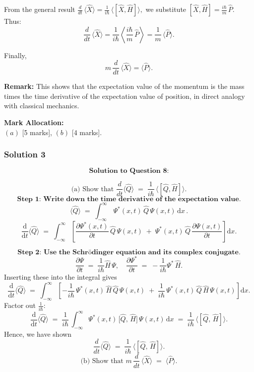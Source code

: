 \documentclass{article}
\begin{document}
From the general result
\(\displaystyle \frac{d}{dt}\,\langle \hat{X} \rangle 
= \frac{1}{i\hbar}\,\bigl\langle [\hat{X}, \hat{H}] \bigr\rangle,\)
we substitute \([\hat{X}, \hat{H}] = \frac{i\hbar}{m}\,\hat{P}\). Thus:
\[
\frac{d}{dt}\,\langle \hat{X} \rangle 
= \frac{1}{i\hbar} \left\langle \frac{i\hbar}{m}\,\hat{P} \right\rangle 
= \frac{1}{m}\,\langle \hat{P} \rangle.
\]

Finally,
\[
\boxed{m\,\frac{d}{dt}\,\langle \hat{X} \rangle = \langle \hat{P} \rangle.}
\]

\textbf{Remark:} This shows that the expectation value of the momentum is the mass times the time derivative of the expectation value of position, in direct analogy with classical mechanics.

\textbf{Mark Allocation:}\\
\((a)\) [5 marks], \quad \((b)\) [4 marks].

\subsubsection{Solution 3}
\[
\textbf{Solution to Question 8:}
\]

\[
\text{(a) Show that } \frac{d}{dt}\langle \hat{Q} \rangle \;=\; \frac{1}{i\hbar}\,\langle [\hat{Q},\hat{H}] \rangle.
\]
\[
\textbf{Step 1: Write down the time derivative of the expectation value.}
\]
\[
\langle \hat{Q} \rangle \;=\;\int_{-\infty}^{\infty}\,\Psi^*(x,t)\,\hat{Q}\,\Psi(x,t)\,\mathrm{d}x\,.
\]
\[
\frac{\mathrm{d}}{\mathrm{d}t}\langle \hat{Q} \rangle 
\;=\;\int_{-\infty}^{\infty} \left[\frac{\partial \Psi^*(x,t)}{\partial t}\,\hat{Q}\,\Psi(x,t) \;+\; \Psi^*(x,t)\,\hat{Q}\,\frac{\partial \Psi(x,t)}{\partial t}\right]\mathrm{d}x.
\]

\[
\textbf{Step 2: Use the Schr\"odinger equation and its complex conjugate.}
\]
\[
\frac{\partial \Psi}{\partial t} 
\;=\;\frac{1}{i\hbar}\hat{H}\,\Psi,\quad
\frac{\partial \Psi^*}{\partial t} 
\;=\;-\frac{1}{i\hbar}\Psi^*\,\hat{H}.
\]
Inserting these into the integral gives
\[
\frac{\mathrm{d}}{\mathrm{d}t}\langle \hat{Q} \rangle 
\;=\;\int_{-\infty}^{\infty}\left[-\frac{1}{i\hbar}\,\Psi^*(x,t)\,\hat{H}\,\hat{Q}\,\Psi(x,t)\;+\;\frac{1}{i\hbar}\,\Psi^*(x,t)\,\hat{Q}\,\hat{H}\,\Psi(x,t)\right]\mathrm{d}x.
\]
Factor out \(\tfrac{1}{i\hbar}\):
\[
\frac{\mathrm{d}}{\mathrm{d}t}\langle \hat{Q} \rangle
\;=\;\frac{1}{i\hbar}\,\int_{-\infty}^{\infty} \Psi^*(x,t)\,\bigl[\hat{Q},\,\hat{H}\bigr]\,\Psi(x,t)\,\mathrm{d}x
\;=\;\frac{1}{i\hbar}\,\langle [\hat{Q},\,\hat{H}] \rangle.
\]
Hence, we have shown
\[
\frac{d}{dt}\langle \hat{Q} \rangle 
\;=\;\frac{1}{i\hbar}\,\langle [\hat{Q},\,\hat{H}] \rangle.
\]
\[
\text{(b) Show that } m\,\frac{d}{dt}\,\langle \hat{X}\rangle \;=\;\langle \hat{P}\rangle.
\]
\end{document}

